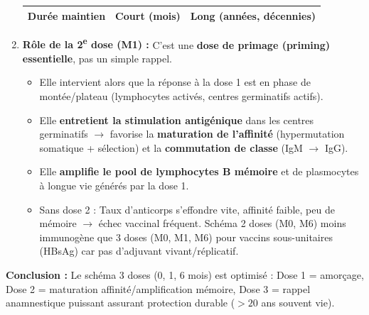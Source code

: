 \documentclass[11pt]{article}
\begin{document}
\begin{exoresolu}
\begin{enumerate}
\begin{center}
\begin{tabular}{|l|c|c|}
        \textbf{Durée maintien} & Court (mois) & \textbf{Long (années, décennies)} \\ \hline
        \end{tabular}
        \end{center}
        \item \textbf{Rôle de la 2\textsuperscript{e} dose (M1) :} C'est une \textbf{dose de primage (priming) essentielle}, pas un simple rappel.
        \begin{itemize}
            \item Elle intervient alors que la réponse à la dose 1 est en phase de montée/plateau (lymphocytes activés, centres germinatifs actifs).
            \item Elle \textbf{entretient la stimulation antigénique} dans les centres germinatifs $\rightarrow$ favorise la \textbf{maturation de l'affinité} (hypermutation somatique + sélection) et la \textbf{commutation de classe} (IgM $\rightarrow$ IgG).
            \item Elle \textbf{amplifie le pool de lymphocytes B mémoire} et de plasmocytes à longue vie générés par la dose 1.
            \item Sans dose 2 : Taux d'anticorps s'effondre vite, affinité faible, peu de mémoire $\rightarrow$ échec vaccinal fréquent. Schéma 2 doses (M0, M6) moins immunogène que 3 doses (M0, M1, M6) pour vaccins sous-unitaires (HBsAg) car pas d'adjuvant vivant/réplicatif.
        \end{itemize}
    \end{enumerate}
    \textbf{Conclusion :} Le schéma 3 doses (0, 1, 6 mois) est optimisé : Dose 1 = amorçage, Dose 2 = maturation affinité/amplification mémoire, Dose 3 = rappel anamnestique puissant assurant protection durable ($>20$ ans souvent vie).
\end{exoresolu}
\end{document}
